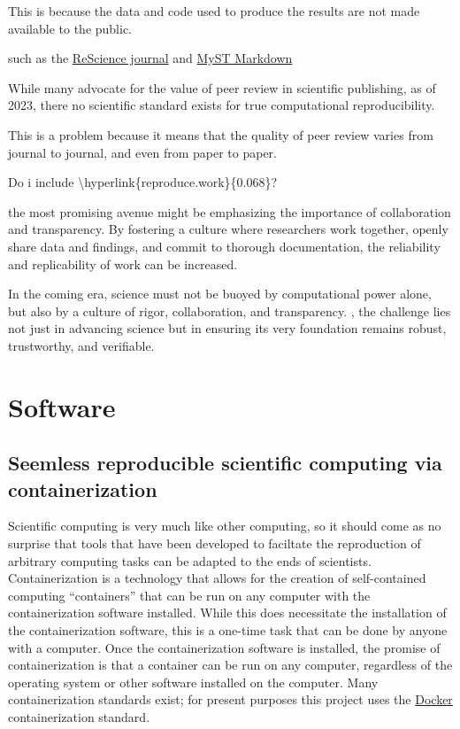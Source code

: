 This is because the data and code used to produce the results are not made available to the public. 

such as the \href{https://rescience.github.io/}{ReScience journal} and \href{https://jupyterbook.org/en/stable/content/myst.html}{MyST Markdown}

While many advocate for the value of peer review in scientific publishing, as of 2023, there no scientific standard exists for true computational reproducibility. 

This is a problem because it means that the quality of peer review varies from journal to journal, and even from paper to paper. 

Do i include \textbackslash{}hyperlink\{reproduce.work\}\{0.068\}?

the most promising avenue might be emphasizing the importance of collaboration and transparency. By fostering a culture where researchers work together, openly share data and findings, and commit to thorough documentation, the reliability and replicability of work can be increased.

In the coming era, science must not be buoyed by computational power alone, but also by a culture of rigor, collaboration, and transparency.
, the challenge lies not just in advancing science but in ensuring its very foundation remains robust, trustworthy, and verifiable. 

\hypertarget{software}{%
\section{Software}\label{software}}

\hypertarget{seemless-reproducible-scientific-computing-via-containerization}{%
\subsection{Seemless reproducible scientific computing via containerization}\label{seemless-reproducible-scientific-computing-via-containerization}}

Scientific computing is very much like other computing, so it should come as no surprise that tools that have been developed to faciltate the reproduction of arbitrary computing tasks can be adapted to the ends of scientists. Containerization is a technology that allows for the creation of self-contained computing ``containers'' that can be run on any computer with the containerization software installed. While this does necessitate the installation of the containerization software, this is a one-time task that can be done by anyone with a computer. Once the containerization software is installed, the promise of containerization is that a container can be run on any computer, regardless of the operating system or other software installed on the computer. Many containerization standards exist; for present purposes this project uses the \href{https://www.docker.com/}{Docker} containerization standard.

